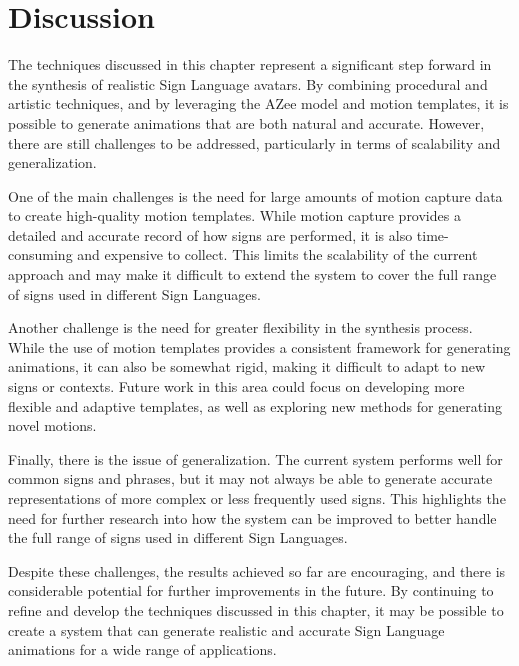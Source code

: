 \documentclass[../../main.tex]{subfiles}
\begin{document}
\section{Discussion}

The techniques discussed in this chapter represent a significant step forward in the synthesis of realistic Sign Language avatars. By combining procedural and artistic techniques, and by leveraging the AZee model and motion templates, it is possible to generate animations that are both natural and accurate. However, there are still challenges to be addressed, particularly in terms of scalability and generalization.

One of the main challenges is the need for large amounts of motion capture data to create high-quality motion templates. While motion capture provides a detailed and accurate record of how signs are performed, it is also time-consuming and expensive to collect. This limits the scalability of the current approach and may make it difficult to extend the system to cover the full range of signs used in different Sign Languages.

Another challenge is the need for greater flexibility in the synthesis process. While the use of motion templates provides a consistent framework for generating animations, it can also be somewhat rigid, making it difficult to adapt to new signs or contexts. Future work in this area could focus on developing more flexible and adaptive templates, as well as exploring new methods for generating novel motions.

Finally, there is the issue of generalization. The current system performs well for common signs and phrases, but it may not always be able to generate accurate representations of more complex or less frequently used signs. This highlights the need for further research into how the system can be improved to better handle the full range of signs used in different Sign Languages.

Despite these challenges, the results achieved so far are encouraging, and there is considerable potential for further improvements in the future. By continuing to refine and develop the techniques discussed in this chapter, it may be possible to create a system that can generate realistic and accurate Sign Language animations for a wide range of applications.


\end{document}
